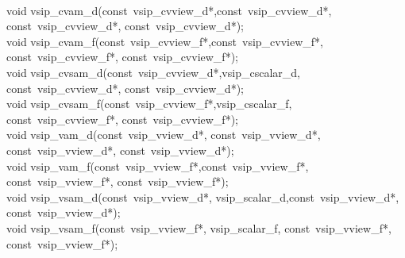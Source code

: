 \\\cvsiplh
\begin{cfuncs}
void vsip\_cvam\_d(const~vsip\_cvview\_d*,const~vsip\_cvview\_d*, const~vsip\_cvview\_d*, const~vsip\_cvview\_d*);\Bs\\
void vsip\_cvam\_f(const~vsip\_cvview\_f*,const~vsip\_cvview\_f*, const~vsip\_cvview\_f*, const~vsip\_cvview\_f*);\Bs\\
void vsip\_cvsam\_d(const~vsip\_cvview\_d*,vsip\_cscalar\_d, const~vsip\_cvview\_d*, const~vsip\_cvview\_d*);\Bs\\
void vsip\_cvsam\_f(const~vsip\_cvview\_f*,vsip\_cscalar\_f, const~vsip\_cvview\_f*, const~vsip\_cvview\_f*);\Bs\\
void vsip\_vam\_d(const~vsip\_vview\_d*, const~vsip\_vview\_d*, const~vsip\_vview\_d*, const~vsip\_vview\_d*);\Bs\\
void vsip\_vam\_f(const~vsip\_vview\_f*,const~vsip\_vview\_f*, const~vsip\_vview\_f*, const~vsip\_vview\_f*);\Bs\\
void vsip\_vsam\_d(const~vsip\_vview\_d*, vsip\_scalar\_d,const~vsip\_vview\_d*, const~vsip\_vview\_d*);\Bs\\
void vsip\_vsam\_f(const~vsip\_vview\_f*, vsip\_scalar\_f,  const~vsip\_vview\_f*, const~vsip\_vview\_f*);\Bs\\
\end{cfuncs}
\\\pyjvsiph
{}
